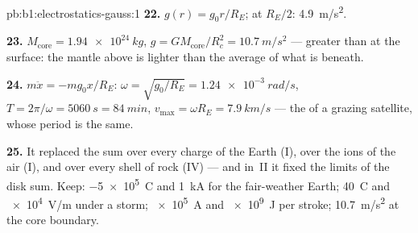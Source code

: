 \begin{solution}{pb:b1:electrostatics-gauss:1}
\textbf{22.} $g(r) = g_0r/R_E$; at $R_E/2$: \qty{4.9}{m/s^2}.

\textbf{23.} $M_{\text{core}} = \qty{1.94e24}{kg}$, $g = GM_{\text{core}}/R_c^2 =
\qty{10.7}{m/s^2}$ --- greater than at the surface: the mantle above is
lighter than the average of what is beneath.

\textbf{24.} $m\ddot x = -mg_0x/R_E$: $\omega = \sqrt{g_0/R_E} = \qty{1.24e-3}{rad/s}$,
$T = 2\pi/\omega = \qty{5060}{s} = \qty{84}{min}$, $v_{\max} = \omega R_E =
\qty{7.9}{km/s}$ --- the  of a grazing satellite, whose
period is the same.

\textbf{25.} It replaced the sum over every charge of the Earth (I),
over the ions of the air (I), and over every shell of rock (IV) --- and
in~II it fixed the limits of the disk sum. Keep: \qty{-5e5}{C} and
\qty{1}{kA} for the fair-weather Earth; \qty{40}{C} and \qty{e4}{V/m} under a
storm; \qty{e5}{A} and \qty{e9}{J} per stroke; \qty{10.7}{m/s^2} at the core
boundary.
\end{solution}
